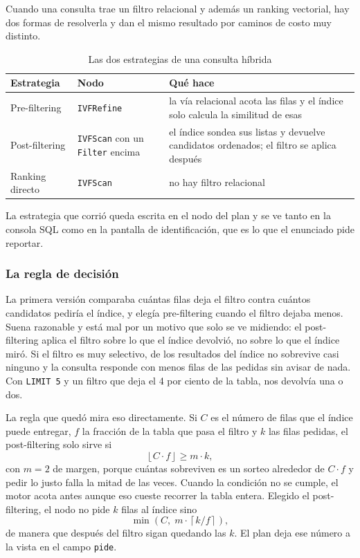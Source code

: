 \documentclass[a4paper,12pt]{article}
\begin{document}
Cuando una consulta trae un filtro relacional y además un ranking vectorial, hay
dos formas de resolverla y dan el mismo resultado por caminos de costo muy
distinto.

\begin{table}[H]
\centering
\caption{Las dos estrategias de una consulta híbrida}
\begin{tabularx}{\textwidth}{@{}llX@{}}
\toprule
\textbf{Estrategia} & \textbf{Nodo} & \textbf{Qué hace} \\
\midrule
Pre-filtering & \texttt{IVFRefine} & la vía relacional acota las filas y el índice
solo calcula la similitud de esas \\
Post-filtering & \texttt{IVFScan} con un \texttt{Filter} encima & el índice sondea
sus listas y devuelve candidatos ordenados; el filtro se aplica después \\
Ranking directo & \texttt{IVFScan} & no hay filtro relacional \\
\bottomrule
\end{tabularx}
\end{table}

La estrategia que corrió queda escrita en el nodo del plan y se ve tanto en la
consola SQL como en la pantalla de identificación, que es lo que el enunciado
pide reportar.

\subsubsection{La regla de decisión}

La primera versión comparaba cuántas filas deja el filtro contra cuántos
candidatos pediría el índice, y elegía pre-filtering cuando el filtro dejaba
menos. Suena razonable y está mal por un motivo que solo se ve midiendo: el
post-filtering aplica el filtro sobre lo que el índice devolvió, no sobre lo que
el índice miró. Si el filtro es muy selectivo, de los resultados del índice no
sobrevive casi ninguno y la consulta responde con menos filas de las pedidas sin
avisar de nada. Con \texttt{LIMIT 5} y un filtro que deja el 4 por ciento de la
tabla, nos devolvía una o dos.

La regla que quedó mira eso directamente. Si $C$ es el número de filas que el
índice puede entregar, $f$ la fracción de la tabla que pasa el filtro y $k$ las
filas pedidas, el post-filtering solo sirve si
\begin{equation}
    \left\lfloor C \cdot f \right\rfloor \ge m \cdot k ,
\end{equation}
con $m = 2$ de margen, porque cuántas sobreviven es un sorteo alrededor de
$C \cdot f$ y pedir lo justo falla la mitad de las veces. Cuando la condición no
se cumple, el motor acota antes aunque eso cueste recorrer la tabla entera.
Elegido el post-filtering, el nodo no pide $k$ filas al índice sino
\begin{equation}
    \min\left(C,\; m \cdot \left\lceil k / f \right\rceil\right),
\end{equation}
de manera que después del filtro sigan quedando las $k$. El plan deja ese número
a la vista en el campo \texttt{pide}.
\end{document}

